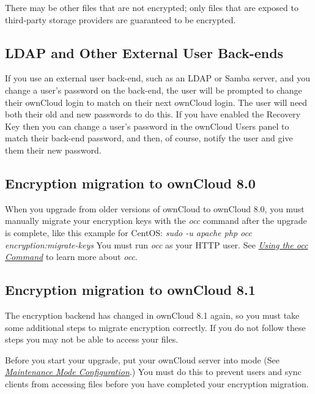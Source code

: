 \documentclass[letterpaper,10pt,english]{sphinxmanual}
\begin{document}
There may be other files that are not encrypted; only files that are exposed to
third-party storage providers are guaranteed to be encrypted.


\subsection{LDAP and Other External User Back-ends}
\label{configuration_files/encryption_configuration:ldap-and-other-external-user-back-ends}
If you use an external user back-end, such as an LDAP or Samba server, and you
change a user's password on the back-end, the user will be prompted to change
their ownCloud login to match on their next ownCloud login. The user will need
both their old and new passwords to do this. If you have enabled the Recovery
Key then you can change a user's password in the ownCloud Users panel to match
their back-end password, and then, of course, notify the user and give them
their new password.


\subsection{Encryption migration to ownCloud 8.0}
\label{configuration_files/encryption_configuration:encryption-migration-to-owncloud-8-0}\label{configuration_files/encryption_configuration:upgrading-encryption-label}
When you upgrade from older versions of ownCloud to ownCloud 8.0, you must manually migrate
your encryption keys with the \emph{occ} command after the upgrade is complete, like this
example for CentOS: \emph{sudo -u apache php occ encryption:migrate-keys} You must run \emph{occ} as
your HTTP user. See {\hyperref[configuration_server/occ_command::doc]{\emph{Using the occ Command}}} to learn more about \emph{occ}.


\subsection{Encryption migration to ownCloud 8.1}
\label{configuration_files/encryption_configuration:encryption-migration-to-owncloud-8-1}
The encryption backend has changed in ownCloud 8.1 again, so you must take some
additional steps to migrate encryption correctly. If you do not follow these
steps you may not be able to access your files.

Before you start your upgrade, put your ownCloud server into
 mode (See {\hyperref[maintenance/enable_maintenance::doc]{\emph{Maintenance Mode Configuration}}}.)
You must do this to prevent users and sync clients from accessing files before
you have completed your encryption migration.
\end{document}
